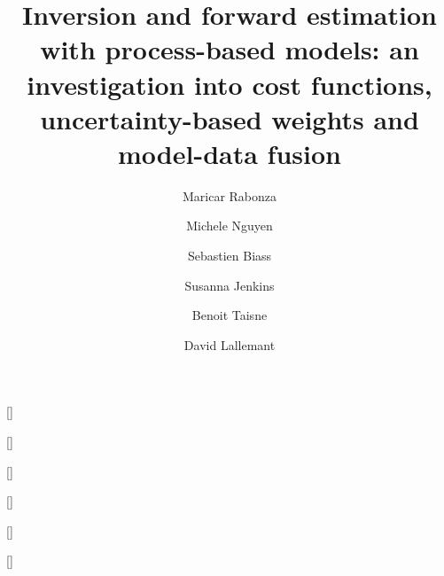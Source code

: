 \documentclass[a4paper,fleqn]{cas-sc}
\begin{document}
\let\WriteBookmarks\relax
\def\floatpagepagefraction{1}
\def\textpagefraction{.001}


\title [mode = title]{Inversion and forward estimation with process-based models: an investigation into cost functions, uncertainty-based weights and model-data fusion}  


\author[1,2]{Maricar Rabonza}[]
\cormark[1] %

\author[2]{Michele Nguyen}[]
\ead{} %

\author[3]{Sebastien Biass}[]
\ead{} %

\author[1,2]{Susanna Jenkins}[]
\ead{} %

\author[1,2]{Benoit Taisne}[]
\ead{} %

\author[1,2]{David Lallemant}[]
\ead{} %
\end{document}

